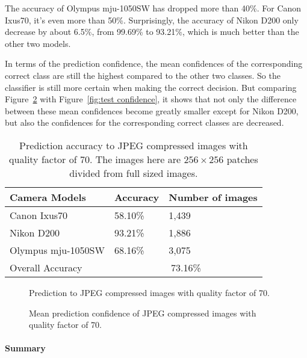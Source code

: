 \documentclass[a4paper, 9pt, twocolumn]{extarticle}
\begin{document}
The accuracy of Olympus mju-1050SW has dropped more than 40\%. For Canon Ixus70, it's even more than 50\%. Surprisingly, the accuracy of Nikon D200 only decrease by about 6.5\%, from 99.69\% to 93.21\%, which is much better than the other two models.

In terms of the prediction confidence, the mean confidences of the corresponding correct class are still the highest compared to the other two classes. So the classifier is still more certain when making the correct decision. But comparing Figure~\ref{fig:jpeg confidence} with Figure~\ref{fig:test confidence}, it shows that not only the difference between these mean confidences become greatly smaller except for Nikon D200, but also the confidences for the corresponding correct classes are decreased.

\begin{table}
	\center
	\begin{tabular}{ |p{3.2cm}|p{1.4cm}|p{2.6cm}| }
		\hline
		Camera Models & Accuracy & Number of images\\
		\hline
		Canon Ixus70 & 58.10\% & 1,439 \\
		Nikon D200 & 93.21\% & 1,886 \\
		Olympus mju-1050SW & 68.16\% & 3,075 \\
		\hline
		Overall Accuracy & \multicolumn{2}{c|}{73.16\%} \\
		\hline
	\end{tabular}
	\caption{\label{tab:jpeg} Prediction accuracy to JPEG compressed images with quality factor of 70. The images here are $ 256 \times 256 $ patches divided from full sized images.}
\end{table}

\begin{figure}
	\centering
	\resizebox{!}{!}{
		{}
	}
	\caption{Prediction to JPEG compressed images with quality factor of 70.}
	\label{fig:jpeg result}
\end{figure}

\begin{figure}
	\centering
	\resizebox{!}{!}{
		{}
	}
	\caption{Mean prediction confidence of JPEG compressed images with quality factor of 70.}
	\label{fig:jpeg confidence}
\end{figure}

\paragraph{Summary}
\label{section:jpeg summary}
\end{document}
